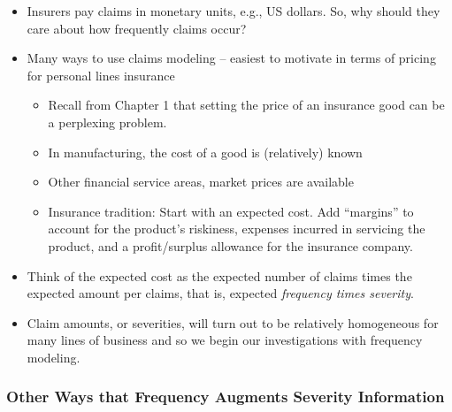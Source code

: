 \documentclass[]{book}
\theoremstyle{definition}
\theoremstyle{definition}
\theoremstyle{definition}
\theoremstyle{remark}
\begin{document}
\begin{itemize}
\item
  Insurers pay claims in monetary units, e.g., US dollars. So, why
  should they care about how frequently claims occur?
\item
  Many ways to use claims modeling -- easiest to motivate in terms of
  pricing for personal lines insurance

  \begin{itemize}
  \item
    Recall from Chapter 1 that setting the price of an insurance good
    can be a perplexing problem.
  \item
    In manufacturing, the cost of a good is (relatively) known
  \item
    Other financial service areas, market prices are available
  \item
    Insurance tradition: Start with an expected cost. Add ``margins'' to
    account for the product's riskiness, expenses incurred in servicing
    the product, and a profit/surplus allowance for the insurance
    company.
  \end{itemize}
\item
  Think of the expected cost as the expected number of claims times the
  expected amount per claims, that is, expected \emph{frequency times
  severity}.
\item
  Claim amounts, or severities, will turn out to be relatively
  homogeneous for many lines of business and so we begin our
  investigations with frequency modeling.
\end{itemize}

\subsubsection{Other Ways that Frequency Augments Severity
Information}\label{other-ways-that-frequency-augments-severity-information}
\end{document}
